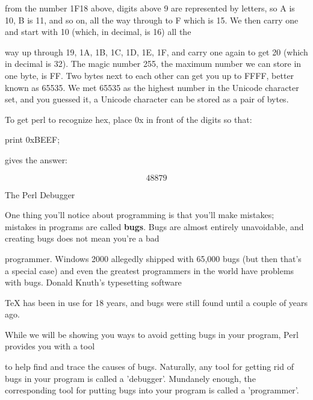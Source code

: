 \documentclass[a4paper,11pt]{book}
\begin{document}
\noindent from the number 1F18 above, digits above 9 are represented by letters, so A is 10, B is 11, and so on, all the way through to F which is 15. We then carry one and start with 10 (which, in decimal, is 16) all the

\noindent way up through 19, 1A, 1B, 1C, 1D, 1E, 1F, and carry one again to get 20 (which in decimal is 32). The magic number 255, the maximum number we can store in one byte, is FF. Two bytes next to each other can get you up to FFFF, better known as 65535. We met 65535 as the highest number in the Unicode character set, and you guessed it, a Unicode character can be stored as a pair of bytes.

\noindent 

\noindent To get perl to recognize hex, place 0x in front of the digits so that:

\noindent 

\noindent 

\noindent print 0xBEEF;

\noindent 

\noindent gives the answer:

\noindent 

\[48879\] 


\noindent 

\noindent The Perl Debugger

\noindent 

\noindent One thing you'll notice about programming is that you'll make mistakes; mistakes in programs are called \textbf{bugs}. Bugs are almost entirely unavoidable, and creating bugs does not mean you're a bad

\noindent programmer. Windows 2000 allegedly shipped with 65,000 bugs (but then that's a special case) and even the greatest programmers in the world have problems with bugs. Donald Knuth's typesetting software

\noindent TeX has been in use for 18 years, and bugs were still found until a couple of years ago.

\noindent 

\noindent While we will be showing you ways to avoid getting bugs in your program, Perl provides you with a tool

\noindent to help find and trace the causes of bugs. Naturally, any tool for getting rid of bugs in your program is called a 'debugger'. Mundanely enough, the corresponding tool for putting bugs into your program is called a 'programmer'.

\noindent 
\end{document}
